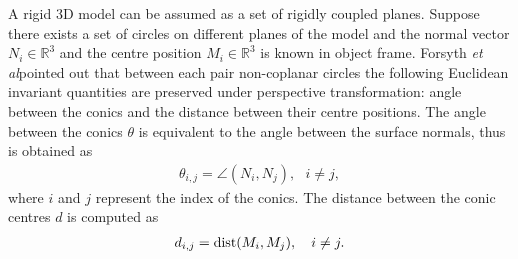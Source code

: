 \documentclass{bmvc2k}
\newcommand{\revise}[2]{\textcolor{red}{\sout{#1}} \textcolor{blue}{#2}}  %
\def\etal{\emph{et al}\bmvaOneDot}
\begin{document}
A rigid 3D model can be assumed as a set of rigidly coupled planes. Suppose there exists a set of circles on different planes of the model and the normal vector $N_i \in \mathbb{R}^3$ and the centre position $M_i \in \mathbb{R}^3$ is known in object frame.
Forsyth \etal pointed out that between each pair non-coplanar circles the following Euclidean invariant quantities are preserved under perspective transformation: angle between the conics and the distance between their centre positions.
The angle between the conics $\theta$ is equivalent to the angle between the surface normals, thus is obtained as
\begin{align}
\theta_{i,j} = \angle(N_i,N_j),~~~i \neq j,
\label{eq:invTheta3d}
\end{align}
where $i$ and $j$ represent the index of the conics.
The distance between the conic centres $d$ is computed as
\begin{align}
d_{i,j} = {\rm dist}(M_i,M_j),~~~i \neq j.
\label{eq:invD3d}
\end{align} 
\end{document}
